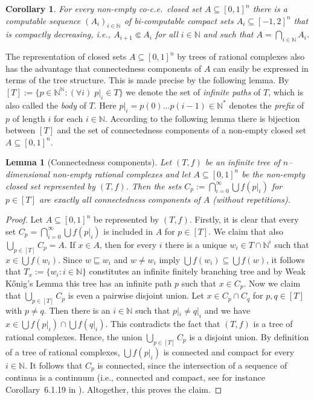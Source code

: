 \documentclass[a4paper]{amsart}
\def\IN{{\mathbb{N}}}
\def\In{\subseteq}
\def\prefix{\sqsubseteq}
\newtheorem{lemma}[theorem]{Lemma}
\newtheorem{corollary}[theorem]{Corollary}
\theoremstyle{definition}
\begin{document}
\begin{corollary}
\label{cor:outer-approximation}
For every non-empty co-c.e.\ closed set $A\In[0,1]^n$ there is a computable sequence $(A_i)_{i\in\IN}$ of bi-computable compact sets $A_i\In[-1,2]^n$
that is compactly decreasing, i.e., $A_{i+1}\Subset A_i$ for all $i\in\IN$ and such that $A=\bigcap_{i\in\IN}A_i$.
\end{corollary}

The representation of closed sets $A\In[0,1]^n$ by trees of rational complexes also has the advantage that connectedness components
of $A$ can easily be expressed in terms of the tree structure. This is made precise by the following lemma.
By $[T]:=\{p\in\IN^\IN:(\forall i)\;p|_i\in T\}$ we denote the set of {\em infinite paths} of $T$, which is also called the {\em body} of $T$.
Here $p|_i=p(0)...p(i-1)\in\IN^*$ denotes the {\em prefix} of $p$ of length $i$ for each $i\in\IN$.
According to the following lemma
there is bijection between $[T]$ and the set of connectedness components of a non-empty closed set $A\In[0,1]^n$.

\begin{lemma}[Connectedness components]
\label{lem:connected-component}
Let $(T,f)$ be an infinite tree of $n$--dimensional non-empty rational complexes and let $A\In[0,1]^n$ be the non-empty closed set represented by $(T,f)$.
Then the sets $C_p:=\bigcap_{i=0}^\infty\bigcup f(p|_i)$ for $p\in[T]$ are exactly all connectedness components of $A$
(without repetitions).
\end{lemma}
\begin{proof}
Let $A\In[0,1]^n$ be represented by $(T,f)$. 
Firstly, it is clear that every set $C_p=\bigcap_{i=0}^\infty\bigcup f(p|_i)$ is included in $A$ for $p\in[T]$.
We claim that also $\bigcup_{p\in[T]}C_p=A$. If $x\in A$, then for every $i$ there is a unique $w_i\in T\cap\IN^i$ such that $x\in\bigcup f(w_i)$.
Since $w\prefix w_i$ and $w\not=w_i$ imply $\bigcup f(w_i)\In\bigcup f(w)$, it follows that $T_x:=\{w_i:i\in\IN\}$ constitutes
an infinite finitely branching tree and by Weak K\H{o}nig's Lemma this tree has an infinite path $p$ such that $x\in C_p$.
Now we claim that $\bigcup_{p\in[T]}C_p$ is even a pairwise disjoint union. 
Let $x\in C_p\cap C_q$ for $p,q\in[T]$ with $p\not=q$. Then there is an $i\in\IN$ such that $p|_i\not=q|_i$ and 
we have $x\in\bigcup f(p|_i)\cap\bigcup f(q|_i)$. This contradicts the fact that $(T,f)$ is a tree of rational complexes.
Hence, the union $\bigcup_{p\in[T]}C_p$ is a disjoint union.
By definition of a tree of rational complexes, $\bigcup f(p|_i)$ is connected and compact for 
every $i\in\IN$. It follows that $C_p$ is connected, since the intersection of a sequence of continua is a continuum (i.e., connected and compact, 
see for instance Corollary~6.1.19 in \cite{Eng89}).
Altogether, this proves the claim.
\end{proof}
\end{document}
